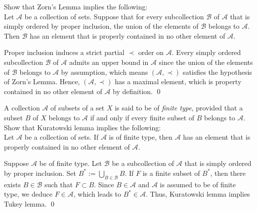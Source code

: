 \documentclass[a4paper,12pt]{article}
\begin{document}
\begin{exe}
	Show that Zorn's Lemma implies the following:\\
	\;\;
	Let \( \mathcal{A} \) be a collection of sets.
	Suppose that for every subcollection \( \mathcal{B} \) of  \( \mathcal{A} \)
	that is simply ordered by proper inclusion, the union of the elements of
	\( \mathcal{B} \) belongs to \( \mathcal{A} \).
	Then \( \mathcal{B} \) has an element that is properly contained in no other element of \( \mathcal{A} \).
\end{exe}
\begin{sol}
	Proper inclusion induces a strict partial \( \prec \) order on \( \mathcal{A} \).
	Every simply ordered subcollection \( \mathcal{B} \) of \( \mathcal{A} \)
	admits an upper bound in \( \mathcal{A} \)
	since the union of the elements of \( \mathcal{B} \) belongs to \( \mathcal{A} \) by assumption,
	which means \( (\mathcal{A},\prec) \) satisfies the hypothesis of
	Zorn's Lemma.
	Hence, \( (\mathcal{A},\prec) \) has a maximal element,
	which is property contained in no other element of \( \mathcal{A} \)
	by definition.
	\qed\end{sol}

\begin{exe}
	A collection \( \mathcal{A} \) of subsets of a set \( X \) is said to be of \textit{finite type},
	provided that a subset \( B \) of \( X \) belongs to \( \mathcal{A} \) if and only if
	every finite subset of \( B \) belongs to \( \mathcal{A} \).
	Show that Kuratowski lemma implies the following:\\
	\;\;
	Let \( \mathcal{A} \) be a collection of sets.
	If \( \mathcal{A} \)  is of finite type,
	then \( \mathcal{A} \) has an element 
	that is properly contained in no other element of \( \mathcal{A} \).
\end{exe}
\begin{sol}
	Suppose \( \mathcal{A} \) be of finite type.
	Let \( \mathcal{B} \) be a subcollection of \( \mathcal{A} \) that is simply ordered by proper inclusion.
	Set \( B^{\ast}:=\bigcup_{B\in \mathcal{B}}B\).
	If \( F \) is a finite subset of \( B^{\ast} \),
	then there exists \( B\in \mathcal{B} \) such that \( F \subset B \).
	Since \( B\in \mathcal{A} \) and \( \mathcal{A} \) is assumed to be of finite type,
	we deduce \( F \in \mathcal{A} \),
	which leads to \( B^{\ast} \in \mathcal{A} \).
	Thus, Kuratowski lemma implies Tukey lemma.
	\qed\end{sol}
\end{document}
